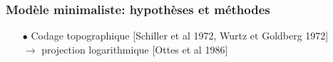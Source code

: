 \documentclass[10pt]{beamer}
\begin{document}
\begin{frame}
  \frametitle{Mod\`ele minimaliste: hypoth\`eses et m\'ethodes}
\begin{itemize}
\item[$\bullet$] Codage topographique [Schiller et al 1972, Wurtz et Goldberg 1972] \\
$\to$ projection logarithmique [Ottes et al 1986]
\end{itemize}
\begin{center}
\end{center}
\end{frame}
\end{document}
